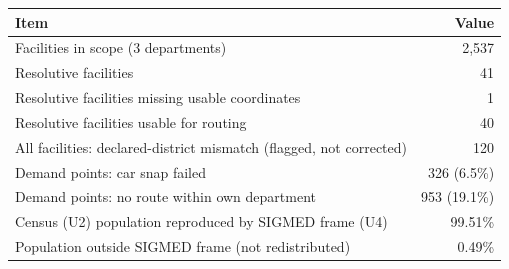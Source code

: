 \begin{tabular}{p{9.5cm}r}
\toprule
Item & Value \\
\midrule
Facilities in scope (3 departments) & 2,537 \\
Resolutive facilities & 41 \\
Resolutive facilities missing usable coordinates & 1 \\
Resolutive facilities usable for routing & 40 \\
All facilities: declared-district mismatch (flagged, not corrected) & 120 \\
Demand points: car snap failed & 326 (6.5\%) \\
Demand points: no route within own department & 953 (19.1\%) \\
Census (U2) population reproduced by SIGMED frame (U4) & 99.51\% \\
Population outside SIGMED frame (not redistributed) & 0.49\% \\
\bottomrule
\end{tabular}

